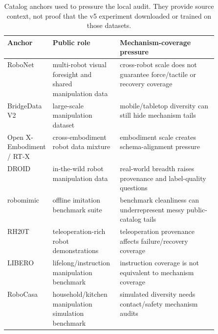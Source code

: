 \begin{table}[t]
\centering
\caption{Catalog anchors used to pressure the local audit. They provide source context, not proof that the v5 experiment downloaded or trained on those datasets.}
\label{tab:catalog-anchors}
\small
\begin{tabularx}{\linewidth}{p{0.18\linewidth}p{0.32\linewidth}X}
\toprule
Anchor & Public role & Mechanism-coverage pressure \\
\midrule
RoboNet & multi-robot visual foresight and shared manipulation data & cross-robot scale does not guarantee force/tactile or recovery coverage \\
BridgeData V2 & large-scale manipulation dataset & mobile/tabletop diversity can still hide mechanism tails \\
Open X-Embodiment / RT-X & cross-embodiment robot data mixture & embodiment scale creates schema-alignment pressure \\
DROID & in-the-wild robot manipulation data & real-world breadth raises provenance and label-quality questions \\
robomimic & offline imitation benchmark suite & benchmark cleanliness can underrepresent messy public-catalog tails \\
RH20T & teleoperation-rich robot demonstrations & teleoperation provenance affects failure/recovery coverage \\
LIBERO & lifelong/instruction manipulation benchmark & instruction coverage is not equivalent to mechanism coverage \\
RoboCasa & household/kitchen manipulation simulation benchmark & simulated diversity needs contact/safety mechanism audits \\
\bottomrule
\end{tabularx}
\end{table}
